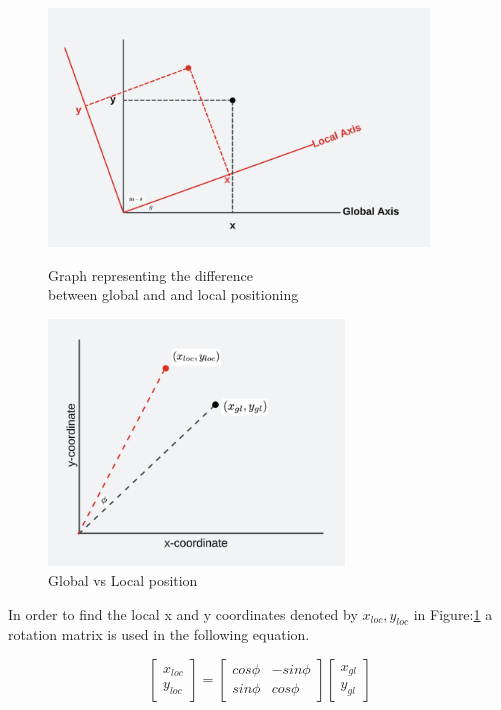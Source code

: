 \documentclass{report}
\begin{document}
\begin{figure}[H]
  \begin{minipage}{0.5\textwidth}
    \centering
    \includegraphics[width=0.9\textwidth]{Pictures/local_vs_global_1.png}
    \caption{Graph representing the difference\\ between global and and local positioning }
    \label{fig:local_vs_global_1}
  \end{minipage}
  \begin{minipage}{0.5\textwidth}
    \centering
    \includegraphics[width=0.7\textwidth]{Pictures/local_vs_global_2.png}
    \caption{Global vs Local position}
    \label{fig:local_vs_global_2}
  \end{minipage}
\end{figure}

In order to find the local x and y coordinates denoted by \(x_{loc}, y_{loc}\) in Figure:\ref{fig:local_vs_global_2} a rotation matrix is used in the following equation. 

\begin{equation}
  \begin{bmatrix}
    x_{loc}\\
    y_{loc}
  \end{bmatrix}
  =
  \begin{bmatrix}
    cos\phi & -sin\phi\\
    sin\phi & cos\phi
  \end{bmatrix}
  \begin{bmatrix}
    x_{gl}\\
    y_{gl}
  \end{bmatrix}
\end{equation}
\end{document}
